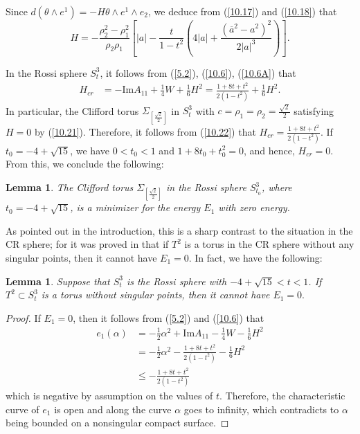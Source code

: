 \documentclass{amsart}
\newtheorem{lem}[theorem]{Lemma}
\theoremstyle{Corollary}
\numberwithin{equation}{section}
\begin{document}
Since $d(\theta\wedge e^1)=-H\theta\wedge e^1\wedge e_2$, 
we deduce from (\ref{10.17}) and (\ref{10.18}) that 
\begin{equation}\label{10.21}
H=-\frac{\rho_2^2-\rho_1^2}{\rho_2\rho_1}\left[|a|-\frac{t}{1-t^2}\left(4|a|+\frac{(\overline{a}^2-a^2)^2}{2|a|^3}\right)\right].
\end{equation}


In the Rossi sphere $S_t^3$, 
it follows from (\ref{5.2}), (\ref{10.6}),
(\ref{10.6A}) that 
\begin{equation}\label{10.22}
\begin{split} 
H_{cr}&=-\mbox{Im} A_{11}+\frac{1}{4}W+\frac{1}{6}H^2=\frac{1+8t+t^2}{2(1-t^2)}+\frac{1}{6}H^2.
\end{split}
\end{equation}
In particular,  the Clifford torus $\Sigma_{[\frac{\sqrt{2}}{2}]}$
in $S^3_t$ with  $c=\rho_1=\rho_2=\frac{\sqrt{2}}{2}$
satisfying $H=0$ by (\ref{10.21}). 
Therefore, it follows from (\ref{10.22}) that 
$H_{cr}=\frac{1+8t+t^2}{2(1-t^2)}$. 
If $t_0=-4+\sqrt{15}$, we have
$0<t_0<1$ and $1+8t_0+t_0^2=0$, 
and hence, 
$H_{cr}=0$. 
From this, we conclude the following: 

\begin{lem}\label{lem5.1}
The Clifford torus
 $\Sigma_{[\frac{\sqrt{2}}{2}]}$ 
in the Rossi sphere $S^3_{t_0}$, where 
$t_0=-4+\sqrt{15}$, 
is 
 a minimizer for the energy $E_1$ 
 with zero energy.    
\end{lem}

As pointed out in the introduction, 
this is a sharp contrast 
to the situation in the CR sphere; for it was proved in \cite{CHY}
that if $T^2$ is a torus in the CR sphere 
without any singular points, then it cannot have $E_1=0$. 
In fact, we  have the following: 

\begin{lem}\label{lem5.3}
Suppose that 
$S^3_t$ is the Rossi sphere with $-4+\sqrt{15}<t<1$. 
If $T^2\subset S^3_t$ is a torus  without singular points, 
then it cannot have $E_1=0.$
\end{lem}
\begin{proof}
If $E_1=0$, then it follows from (\ref{5.2}) and (\ref{10.6}) that 
\begin{equation*}
\begin{split}
e_1(\alpha)&=-\frac{1}{2}\alpha^2+\mbox{Im} A_{11}-\frac{1}{4}W-\frac{1}{6}H^2\\
&=-\frac{1}{2}\alpha^2-\frac{1+8t+t^2}{2(1-t^2)}-\frac{1}{6}H^2\\
&\leq -\frac{1+8t+t^2}{2(1-t^2)}
\end{split}
\end{equation*}
which is negative by assumption on the values of $t$. Therefore, the characteristic curve of $e_1$ is open 
and along the curve $\alpha$ goes to infinity, which contradicts to $\alpha$ being 
bounded on a nonsingular compact surface.   
\end{proof}
\end{document}
